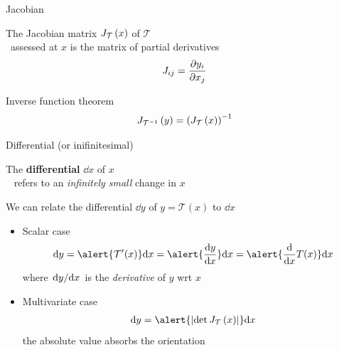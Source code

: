 \documentclass[14pt,dvipsnames]{beamer}
\begin{document}
\begin{frame}{Jacobian}

	The Jacobian matrix $J_{\mathcal T}\left(x\right) $ of  $\mathcal T$ \\
	~assessed at $x$ is the matrix of partial derivatives
	\begin{equation*}
		J_{ij} = \pdv{y_i}{x_j} 
	\end{equation*} 
	
	\pause
	Inverse function theorem
	\begin{equation*}
		J_{{\mathcal T}^{-1}}\left(y\right) = \left( J_{\mathcal T}\left(x\right) \right)^{-1}
	\end{equation*}
	
\end{frame}

\begin{frame}{Differential (or inifinitesimal)}

	The {\bf differential} $\dd x$ of $x$ \\
	~ refers to an \emph{infinitely small} change in $x$\\ \pause
	\vspace{10pt}

	We can relate the differential $\dd y$ of $y = \mathcal T(x)$ to $\dd x$ \pause
	\begin{itemize}
		\item Scalar case
		\begin{equation*}
			\dd y = \alert{\mathcal T'(x)} \dd x = \alert{\dv{y}{x}} \dd x = \alert{\dv{x}T(x)} \dd x
		\end{equation*}
		where \alert{$\dv*{y}{x}$} is the \emph{derivative} of $y$ wrt $x$ \pause
		\item Multivariate case
		\begin{equation*}
        			\begin{aligned}
			        \dd y = \alert{\djac{\mathcal T}{x}} \dd x %
		        	\end{aligned}
	        	\end{equation*}
		the absolute value absorbs the orientation 
	\end{itemize}

\end{frame}
\end{document}
